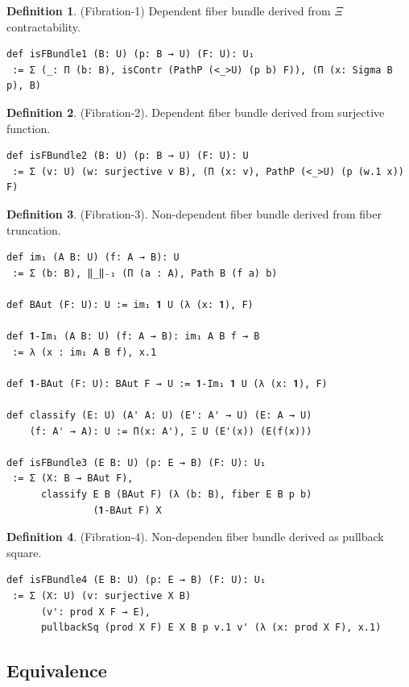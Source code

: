 \documentclass{article}
\theoremstyle{definition}
\newtheorem{definition}{Definition}
\begin{document}
\newpage
\begin{definition} (Fibration-1) Dependent fiber bundle derived from $\Xi$ contractability.
\begin{lstlisting}
def isFBundle1 (B: U) (p: B → U) (F: U): U₁
 := Σ (_: Π (b: B), isContr (PathP (<_>U) (p b) F)), (Π (x: Sigma B p), B)
\end{lstlisting}
\end{definition}

\begin{definition} (Fibration-2). Dependent fiber bundle derived from surjective function.
\begin{lstlisting}
def isFBundle2 (B: U) (p: B → U) (F: U): U
 := Σ (v: U) (w: surjective v B), (Π (x: v), PathP (<_>U) (p (w.1 x)) F)
\end{lstlisting}
\end{definition}

\begin{definition} (Fibration-3). Non-dependent fiber bundle derived from fiber truncation.
\begin{lstlisting}[mathescape=true]
def im₁ (A B: U) (f: A → B): U
 := Σ (b: B), ‖_‖₋₁ (Π (a : A), Path B (f a) b)

def BAut (F: U): U := im₁ 𝟏 U (λ (x: 𝟏), F)

def 𝟏-Im₁ (A B: U) (f: A → B): im₁ A B f → B
 := λ (x : im₁ A B f), x.1

def 𝟏-BAut (F: U): BAut F → U := 𝟏-Im₁ 𝟏 U (λ (x: 𝟏), F)

def classify (E: U) (A' A: U) (E': A' → U) (E: A → U)
    (f: A' → A): U := Π(x: A'), Ξ U (E'(x)) (E(f(x)))

def isFBundle3 (E B: U) (p: E → B) (F: U): U₁
 := Σ (X: B → BAut F),
      classify E B (BAut F) (λ (b: B), fiber E B p b)
               (𝟏-BAut F) X
\end{lstlisting}
\end{definition}

\begin{definition} (Fibration-4). Non-dependen fiber bundle derived as pullback square.
\begin{lstlisting}
def isFBundle4 (E B: U) (p: E → B) (F: U): U₁
 := Σ (X: U) (v: surjective X B)
      (v': prod X F → E),
      pullbackSq (prod X F) E X B p v.1 v' (λ (x: prod X F), x.1)
\end{lstlisting}
\end{definition}



\newpage
\subsection{Equivalence}
\end{document}
